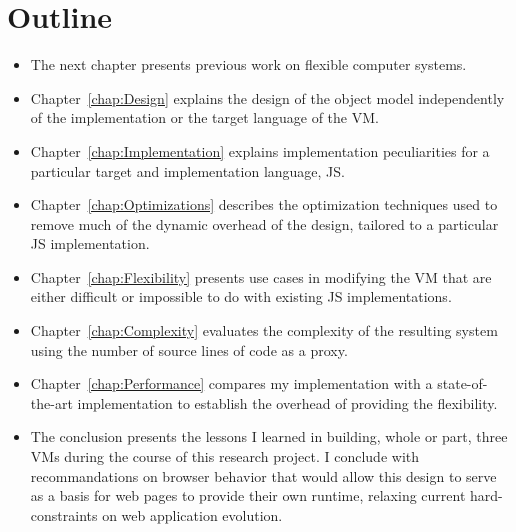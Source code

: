 \section{Outline}
\begin{itemize}
    \item The next chapter presents previous work on flexible computer systems.
    \item Chapter~\ref{chap:Design} explains the design of the object model
    independently of the implementation or the target language of the VM.
    \item Chapter~\ref{chap:Implementation} explains implementation
    peculiarities for a particular target and implementation language, JS.
    \item Chapter~\ref{chap:Optimizations} describes the optimization
    techniques used to remove much of the dynamic overhead of the design,
    tailored to a particular JS implementation.  
    \item Chapter~\ref{chap:Flexibility} presents use cases in modifying the VM
    that are either difficult or impossible to do with existing JS
    implementations.
    \item Chapter~\ref{chap:Complexity} evaluates the complexity of the
    resulting system using the number of source lines of code as a proxy.
    \item Chapter~\ref{chap:Performance} compares my implementation with a
    state-of-the-art implementation to establish the overhead of providing the
    flexibility.  
    \item The conclusion presents the lessons I learned in building, whole or
    part, three VMs during the course of this research project. I conclude with
    recommandations on browser behavior that would allow this design to
    serve as a basis for web pages to provide their own runtime, relaxing
    current hard-constraints on web application evolution.
\end{itemize}
